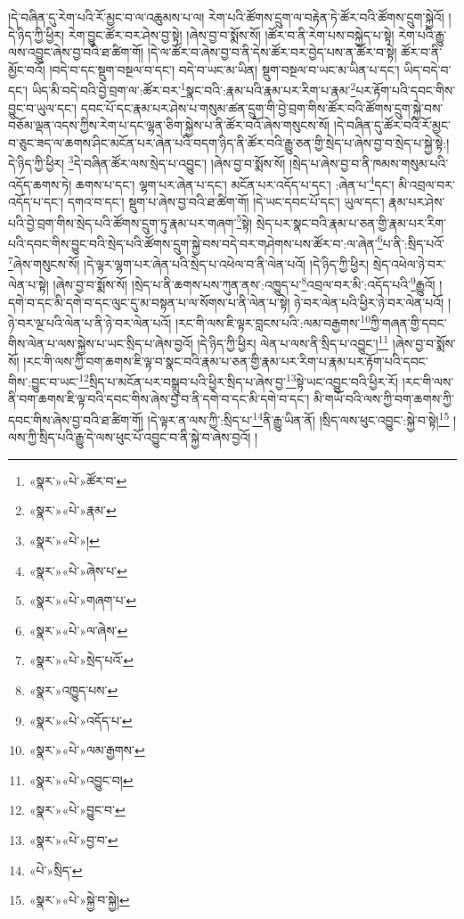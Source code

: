 །དེ་བཞིན་དུ་རེག་པའི་རོ་མྱང་བ་ལ་འཆུམས་པ་ལ། རེག་པའི་ཚོགས་དྲུག་ལ་བརྟེན་ཏེ་ཚོར་བའི་ཚོགས་དྲུག་སྐྱེའོ། །དེ་ཉིད་ཀྱི་ཕྱིར། རེག་བྱུང་ཚོར་བར་ཤེས་བྱ་སྟེ། །ཞེས་བྱ་བ་སྨོས་སོ། །ཚོར་བ་ནི་རེག་པས་བསྐྱེད་པ་སྟེ། རེག་པའི་རྒྱུ་ལས་འབྱུང་ཞེས་བྱ་བའི་ཐ་ཚིག་གོ། །དེ་ལ་ཚོར་བ་ཞེས་བྱ་བ་ནི་དེས་ཚོར་བར་བྱེད་པས་ན་ཚོར་བ་སྟེ། ཚོར་བ་ནི་མྱོང་བའོ། །བདེ་བ་དང་སྡུག་བསྔལ་བ་དང་། བདེ་བ་ཡང་མ་ཡིན། སྡུག་བསྔལ་བ་ཡང་མ་ཡིན་པ་དང་། ཡིད་བདེ་བ་དང་། ཡིད་མི་བདེ་བའི་བྱེ་བྲག་ལ་:ཚོར་བར་\footnote{«སྣར་»«པེ་»ཚོར་བ་}སྣང་བའི་:རྣམ་པའི་རྣམ་པར་རིག་པ་རྣམ་\footnote{«སྣར་»«པེ་»རྣམ་}པར་རྟོག་པའི་དབང་གིས་བྱུང་བ་ཡུལ་དང་། དབང་པོ་དང་རྣམ་པར་ཤེས་པ་གསུམ་ཚན་དྲུག་གི་བྱེ་བྲག་གིས་ཚོར་བའི་ཚོགས་དྲུག་སྐྱེ་བས་བཅོམ་ལྡན་འདས་ཀྱིས་རེག་པ་དང་ལྷན་ཅིག་སྐྱེས་པ་ནི་ཚོར་བའོ་ཞེས་གསུངས་སོ། །དེ་བཞིན་དུ་ཚོར་བའི་རོ་མྱང་བ་ཅུང་ཟད་ལ་ཆགས་ཤིང་མངོན་པར་ཞེན་པའི་བདག་ཉིད་ནི་ཚོར་བའི་རྒྱུ་ཅན་གྱི་སྲེད་པ་ཞེས་བྱ་བ་སྲེད་པ་སྐྱེ་སྟེ:། དེ་ཉིད་ཀྱི་ཕྱིར། \footnote{«སྣར་»«པེ་»།  }དེ་བཞིན་ཚོར་ལས་སྲེད་པ་འབྱུང་། །ཞེས་བྱ་བ་སྨོས་སོ། །སྲེད་པ་ཞེས་བྱ་བ་ནི་ཁམས་གསུམ་པའི་འདོད་ཆགས་ཏེ། ཆགས་པ་དང་། ལྷག་པར་ཞེན་པ་དང་། མངོན་པར་འདོད་པ་དང་། :ཞེན་པ་\footnote{«སྣར་»«པེ་»ཞེས་པ་}དང་། མི་འབྲལ་བར་འདོད་པ་དང་། དགའ་བ་དང་། སྡུག་པ་ཞེས་བྱ་བའི་ཐ་ཚིག་གོ། །དེ་ཡང་དབང་པོ་དང་། ཡུལ་དང་། རྣམ་པར་ཤེས་པའི་བྱེ་བྲག་གིས་སྲེད་པའི་ཚོགས་དྲུག་ཏུ་རྣམ་པར་གཞག་\footnote{«སྣར་»«པེ་»གཞག་པ་}སྟེ། སྲེད་པར་སྣང་བའི་རྣམ་པ་ཅན་གྱི་རྣམ་པར་རིག་པའི་དབང་གིས་བྱུང་བའི་སྲེད་པའི་ཚོགས་དྲུག་སྐྱེ་བས་བདེ་བར་གཤེགས་པས་ཚོར་བ་:ལ་ཞེན་\footnote{«སྣར་»«པེ་»ལ་ཞེས་}པ་ནི་:སྲིད་པའོ་\footnote{«སྣར་»«པེ་»སྲེད་པའོ་}ཞེས་གསུངས་སོ། །དེ་ལྟར་ལྷག་པར་ཞེན་པའི་སྲེད་པ་འཕེལ་བ་ནི་ལེན་པའོ། །དེ་ཉིད་ཀྱི་ཕྱིར། སྲེད་འཕེལ་ཉེ་བར་ལེན་པ་སྟེ། །ཞེས་བྱ་བ་སྨོས་སོ། །སྲེད་པ་ནི་ཆགས་པས་ཀུན་ནས་:འཁྱུད་པ་\footnote{«སྣར་»འཁྱུད་པས་}འབྲལ་བར་མི་:འདོད་པའི་\footnote{«སྣར་»«པེ་»འདོད་པ་}རྒྱུའོ། །དགེ་བ་དང་མི་དགེ་བ་དང་ལུང་དུ་མ་བསྟན་པ་ལ་སོགས་པ་ནི་ལེན་པ་སྟེ། ཉེ་བར་ལེན་པའི་ཕྱིར་ཉེ་བར་ལེན་པའོ། །ཉེ་བར་ལྔ་པའི་ལེན་པ་ནི་ཉེ་བར་ལེན་པའོ། །རང་གི་ལས་ཇི་ལྟར་བླངས་པའི་:ལམ་བརྒྱགས་\footnote{«སྣར་»«པེ་»ལམ་རྒྱགས་}ཀྱི་གཞན་གྱི་དབང་གིས་ལེན་པ་ལས་སྐྱེས་པ་ཡང་སྲིད་པ་ཞེས་བྱའོ། །དེ་ཉིད་ཀྱི་ཕྱིར། ལེན་པ་ལས་ནི་སྲིད་པ་འབྱུང་།\footnote{«སྣར་»«པེ་»འབྱུང་བ།} །ཞེས་བྱ་བ་སྨོས་སོ། །རང་གི་ལས་ཀྱི་བག་ཆགས་ཇི་ལྟ་བ་སྣང་བའི་རྣམ་པ་ཅན་གྱི་རྣམ་པར་རིག་པ་རྣམ་པར་རྟོག་པའི་དབང་གིས་:བྱུང་བ་ཡང་\footnote{«སྣར་»«པེ་»བྱུང་བ་}སྲིད་པ་མངོན་པར་བསྒྲུབ་པའི་ཕྱིར་སྲིད་པ་ཞེས་བྱ་\footnote{«སྣར་»«པེ་»བྱ་བ་}སྟེ་ཡང་འབྱུང་བའི་ཕྱིར་རོ། །རང་གི་ལས་ནི་བག་ཆགས་ཇི་ལྟ་བའི་དབང་གིས་ཞེས་བྱ་བ་ནི་དགེ་བ་དང་མི་དགེ་བ་དང་། མི་གཡོ་བའི་ལས་ཀྱི་བག་ཆགས་ཀྱི་དབང་གིས་ཞེས་བྱ་བའི་ཐ་ཚིག་གོ། །དེ་ལྟར་ན་ལས་ཀྱི་:སྲིད་པ་\footnote{«པེ་»སྲིད་}ནི་རྒྱུ་ཡིན་ནོ། །སྲིད་ལས་ཕུང་འབྱུང་:སྐྱེ་བ་སྟེ།\footnote{«སྣར་»«པེ་»སྐྱེ་བ་སྐྱེ།} །ལས་ཀྱི་སྲིད་པའི་རྒྱུ་དེ་ལས་ཕུང་པོ་འབྱུང་བ་ནི་སྐྱེ་བ་ཞེས་བྱའོ། །
